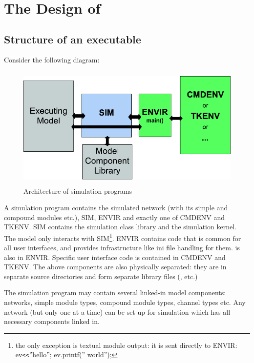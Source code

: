\chapter{The Design of {\opp}}
\label{cha:the-design-of-omnet}

\section{Structure of an {\opp} executable}

Consider the following diagram: 

\begin{figure}[htbp]
  \begin{center}
    \includegraphics[width=4.757in, height=2.412in]{figures/usmanFig18}
    \caption{Architecture of {\opp} simulation programs}
  \end{center}
\end{figure}

A simulation program contains the simulated network (with its
simple and compound
modules etc.), SIM, ENVIR and exactly one of CMDENV and TKENV. SIM
contains the simulation class library
and the simulation kernel. The model only interacts with
SIM\footnote{the only exception is textual module output: it is sent
  directly to ENVIR: ev\texttt{<}\texttt{<}''hello''; ev.printf(''
  world'');}. ENVIR contains code that is common for all user
interfaces, and provides infrastructure like ini file handling for
them.  is also in ENVIR. Specific user interface code is
contained in CMDENV and TKENV. The above components are also
physically separated: they are in separate source directories and form
separate library files (,  etc.)

The simulation program may contain several linked-in model
components: networks,
simple module types,
compound module types, channel types etc. Any
network (but only one at a time) can be set up for simulation which
has all necessary components linked in.





